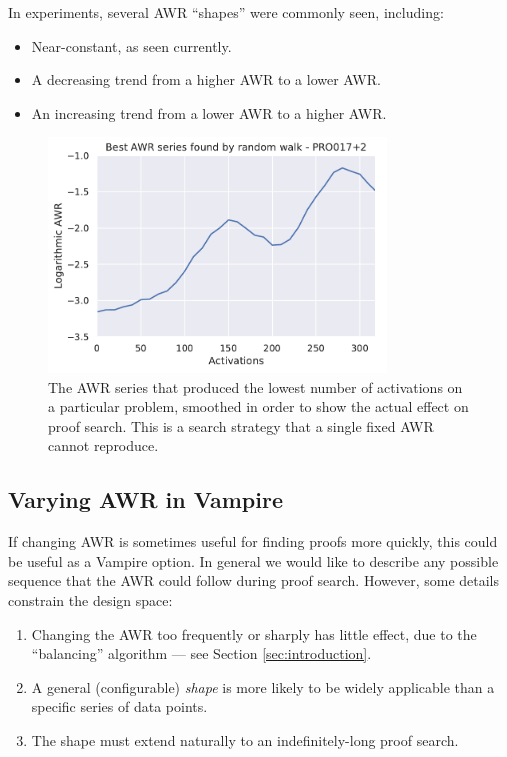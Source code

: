 \documentclass{llncs}
\begin{document}

In experiments, several AWR ``shapes'' were commonly seen, including:
\begin{itemize}
	\item Near-constant, as seen currently.
	\item A decreasing trend from a higher AWR to a lower AWR.
	\item An increasing trend from a lower AWR to a higher AWR.
\end{itemize}

\begin{figure}
	\centering
	\includegraphics[width=0.8\textwidth]{random-walk}
	\caption{The AWR series that produced the lowest number of activations on a particular problem, smoothed in order to show the actual effect on proof search. This is a search strategy that a single fixed AWR cannot reproduce.}
	\label{fig:random-walk}
\end{figure}

\subsection{Varying AWR in Vampire} \label{sec:varying:implementation}

If changing AWR is sometimes useful for finding proofs more quickly, this could be useful as a Vampire option.
In general we would like to describe any possible sequence that the AWR could follow during proof search.
However, some details constrain the design space:
\begin{enumerate}
	\item Changing the AWR too frequently or sharply has little effect, due to the ``balancing'' algorithm --- see Section \ref{sec:introduction}.
	\item A general (configurable) \emph{shape} is more likely to be widely applicable than a specific series of data points.
	\item The shape must extend naturally to an indefinitely-long proof search.
\end{enumerate}
\end{document}
